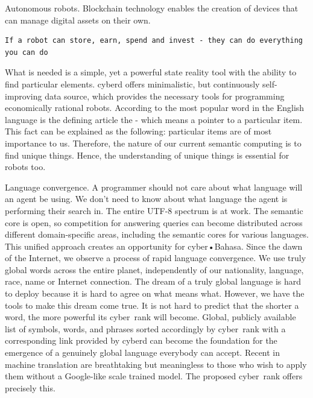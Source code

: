 \documentclass[8pt,oneside]{amsart}
\newcommand{\linkgreen}[2]{\href{#1}{\color{green}{#2}}}
\newcommand{\code}[1]{{\PlayBold #1}}
\begin{document}
\code{Autonomous robots}. Blockchain technology enables the creation of devices that can manage digital assets on their own.

\begin{lstlisting}
If a robot can store, earn, spend and invest - they can do everything you can do
\end{lstlisting}

What is needed is a simple, yet a powerful state reality tool with the ability to find particular elements. \code{cyberd} offers minimalistic, but continuously self-improving data source, which provides the necessary tools for programming economically rational robots. According to \linkgreen{https://github.com/first20hours/google-10000-english}{top-10,000 English words} the most popular word in the English language is the defining article \code{the} - which means a pointer to a particular item. This fact can be explained as the following: particular items are of most importance to us. Therefore, the nature of our current semantic computing is to find unique things. Hence, the understanding of unique things is essential for robots too.

\code{Language convergence}. A programmer should not care about what language will an agent be using. We don't need to know about what language the agent is performing their search in. The entire UTF-8 spectrum is at work. The semantic core is open, so competition for answering queries can become distributed across different domain-specific areas, including the semantic cores for various languages. This unified approach creates an opportunity for cyber•Bahasa. Since the dawn of the Internet, we observe a process of rapid language convergence. We use truly global words across the entire planet, independently of our nationality, language, race, name or Internet connection. The dream of a truly global language is hard to deploy because it is hard to agree on what means what. However, we have the tools to make this dream come true. It is not hard to predict that the shorter a word, the more powerful its cyber~rank will become. Global, publicly available list of symbols, words, and phrases sorted accordingly by cyber~rank with a corresponding link provided by cyberd can become the foundation for the emergence of a genuinely global language everybody can accept. Recent \linkgreen{https://ipfs.io/ipfs/QmQUWBhDMfPKgFt3NfbxM1VU22oU8CRepUzGPBDtopwap1}{scientific advances} in machine translation are breathtaking but meaningless to those who wish to apply them without a Google-like scale trained model. The proposed cyber~rank offers precisely this.
\end{document}
